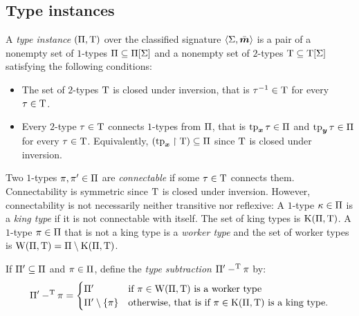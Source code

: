 \subsection{Type instances}
\begin{definition}\label{def:tpinst-twovar}
A \emph{type instance} $(\Pi,\mathrm{T})$ over the classified signature
$\left\langle \mathrm{\Sigma},\bar{\bm{m}} \right\rangle$ is a pair of a nonempty set of $1$-types
$\Pi\subseteq\Pi[\mathrm{\Sigma}]$ and a nonempty set of $2$-types $\mathrm{T}\subseteq\mathrm{T}[\mathrm{\Sigma}]$ satisfying the following conditions:
\begin{itemize}
  \item
  The set of $2$-types $\mathrm{T}$ is closed under inversion, that is
  $\tau^{-1}\in\mathrm{T}$ for every $\tau\in\mathrm{T}$.
  \item
  Every $2$-type $\tau\in\mathrm{T}$ connects $1$-types
  from $\Pi$, that is $\operatorname{tp}_{\bm{x}}\tau\in\Pi$ and $\operatorname{tp}_{\bm{y}}\tau\in\Pi$ for every
  $\tau\in\mathrm{T}$.
  Equivalently, 
  $(\operatorname{tp}_{\bm{x}}\restriction\mathrm{T})\subseteq\Pi$ since $\mathrm{T}$ is closed under
  inversion.
\end{itemize}
Two $1$-types $\pi, {\pi'} \in \Pi$ are \emph{connectable} if some
$\tau\in\mathrm{T}$ connects them.
Connectability is symmetric since $\mathrm{T}$ is closed under inversion.
However, connectability is not necessarily neither transitive nor reflexive:
A $1$-type $\kappa \in \Pi$ is a \emph{king type} if 
it is not connectable with itself.
The set of king types is $\mathrm{K}(\Pi,\mathrm{T})$.
A $1$-type $\pi \in \Pi$ that is not a king type is a \emph{worker type}
and the set of worker types is $\mathrm{W}(\Pi,\mathrm{T}) = \Pi \setminus \mathrm{K}(\Pi,\mathrm{T})$.

If ${\Pi'} \subseteq \Pi$ and $\pi \in \Pi$, define the
\emph{type subtraction} ${\Pi'} -^{\mathrm{T}} \pi$ by:
\[
  {\Pi'} -^{\mathrm{T}} \pi = \begin{cases}
    {\Pi'} &\text{if } \pi \in \mathrm{W}(\Pi,\mathrm{T}) \text{ is a worker type} \\
    {\Pi'} \setminus \left\{\pi\right\} &\text{otherwise, that is if } \pi \in
    \mathrm{K}(\Pi,\mathrm{T}) \text{ is a king type.}
  \end{cases}
\]
\end{definition}

